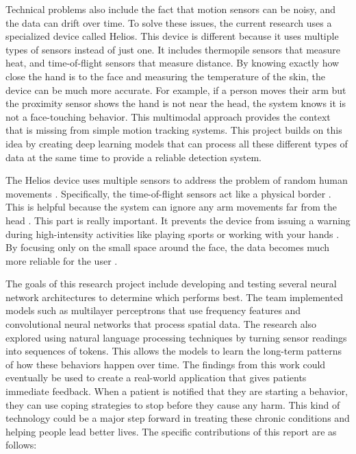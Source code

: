\documentclass[conference]{IEEEtran}
\begin{document}
Technical problems also include the fact that motion sensors can be noisy, and the data can drift over time.\cite{alesmaeil2025nail} To solve these issues, the current research uses a specialized device called Helios.\cite{zhang2025detection} This device is different because it uses multiple types of sensors instead of just one. It includes thermopile sensors that measure heat, and time-of-flight sensors that measure distance.\cite{alesmaeil2025nail} By knowing exactly how close the hand is to the face and measuring the temperature of the skin, the device can be much more accurate.\cite{zhang2025detection} For example, if a person moves their arm but the proximity sensor shows the hand is not near the head, the system knows it is not a face-touching behavior.\cite{alesmaeil2025nail} This multimodal approach provides the context that is missing from simple motion tracking systems.\cite{zhang2025detection} This project builds on this idea by creating deep learning models that can process all these different types of data at the same time to provide a reliable detection system.\cite{zhang2025detection}


The Helios device uses multiple sensors to address the problem of random human movements \cite{zhang2025detection}. Specifically, the time-of-flight sensors act like a physical border \cite{zhang2025detection}. This is helpful because the system can ignore any arm movements far from the head \cite{zhang2025detection}. This part is really important. It prevents the device from issuing a warning during high-intensity activities like playing sports or working with your hands \cite{roboteye2025}. By focusing only on the small space around the face, the data becomes much more reliable for the user \cite{zhang2025detection}.


The goals of this research project include developing and testing several neural network architectures to determine which performs best. The team implemented models such as multilayer perceptrons that use frequency features and convolutional neural networks that process spatial data.\cite{zhang2025detection} The research also explored using natural language processing techniques by turning sensor readings into sequences of tokens.\cite{zhang2025detection} This allows the models to learn the long-term patterns of how these behaviors happen over time.\cite{zhang2025detection} The findings from this work could eventually be used to create a real-world application that gives patients immediate feedback.\cite{alesmaeil2025nail} When a patient is notified that they are starting a behavior, they can use coping strategies to stop before they cause any harm.\cite{searle2025virtual} This kind of technology could be a major step forward in treating these chronic conditions and helping people lead better lives.\cite{searle2025virtual}
The specific contributions of this report are as follows:
\end{document}
